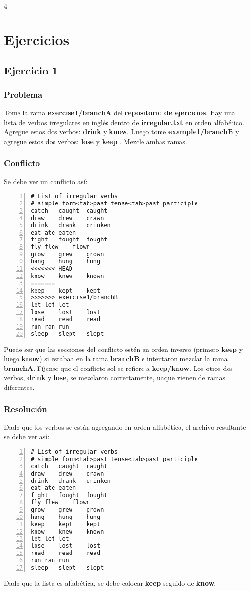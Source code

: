 4 %

\chapter{Ejercicios}

\section{Ejercicio 1}
\label{exercise_01}
\subsection*{Problema}
Tome la rama {\bf exercise1/branchA } del \hyperref[exercises_repo]{\bf repositorio de ejercicios}. Hay una lista
de verbos irregulares en inglés dentro de {\bf irregular.txt} en orden alfabético. Agregue estos dos verbos: {\bf drink} y {\bf know}.
Luego tome {\bf example1/branchB } y agregue estos dos verbos: {\bf lose } y {\bf keep }. Mezcle ambas ramas.

\subsection*{Conflicto}
Se debe ver un conflicto así:
\begin{lstlisting}[style=console_style, numbers=left, caption={\bf Ejercicio 1} - conflicto]
# List of irregular verbs
# simple form<tab>past tense<tab>past participle
catch	caught	caught
draw	drew	drawn
drink	drank	drinken
eat	ate	eaten
fight	fought	fought
fly	flew	flown
grow	grew	grown
hang	hung	hung
<<<<<<< HEAD
know	knew	known
=======
keep	kept	kept
>>>>>>> exercise1/branchB
let	let	let
lose	lost	lost
read	read	read
run	ran	run
sleep	slept	slept
\end{lstlisting}

Puede ser que las secciones del conflicto estén en orden inverso (primero {\bf keep} y luego {\bf know}) si estaban en la rama
{\bf branchB} e intentaron mezclar la rama {\bf branchA}. Fíjense que el conflicto sol se refiere a {\bf keep/know}. Los otros dos verbos,
{\bf drink} y {\bf lose}, se mezclaron correctamente, unque vienen de ramas diferentes.

\subsection*{Resolución}
Dado que los verbos se están agregando en orden alfabético, el archivo resultante se debe ver así:
\begin{lstlisting}[style=console_style, numbers=left, caption={\bf Ejercicio 1} - Resolución]
# List of irregular verbs
# simple form<tab>past tense<tab>past participle
catch	caught	caught
draw	drew	drawn
drink	drank	drinken
eat	ate	eaten
fight	fought	fought
fly	flew	flown
grow	grew	grown
hang	hung	hung
keep	kept	kept
know	knew	known
let	let	let
lose	lost	lost
read	read	read
run	ran	run
sleep	slept	slept
\end{lstlisting}
Dado que la lista es alfabética, se debe colocar {\bf keep} seguido de {\bf know}.


